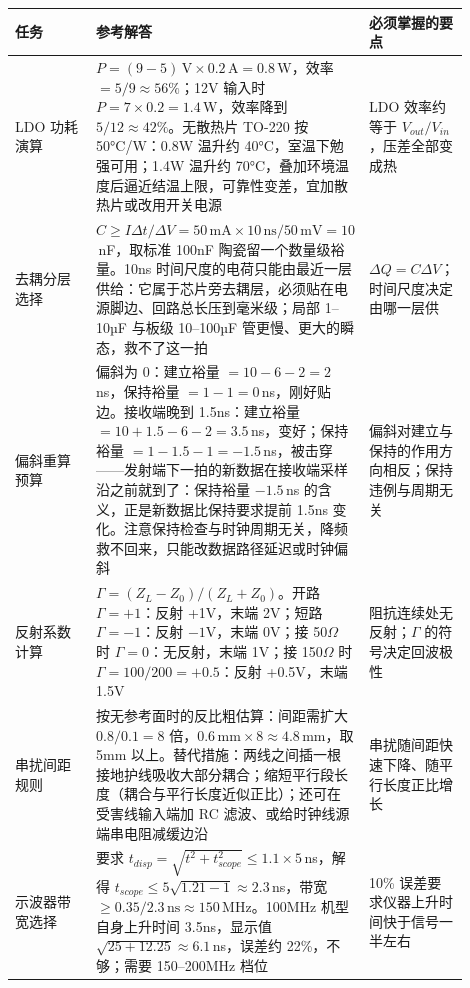 \begin{longtable}{L{0.18\linewidth}L{0.5\linewidth}L{0.22\linewidth}}
\toprule
任务 & 参考解答 & 必须掌握的要点 \\
\midrule
LDO 功耗演算 & $P = (9-5)\,\mathrm{V} \times 0.2\,\mathrm{A} = 0.8$\,W，效率 $= 5/9 \approx 56\%$；12V 输入时 $P = 7 \times 0.2 = 1.4$\,W，效率降到 $5/12 \approx 42\%$。无散热片 TO-220 按 50°C/W：0.8W 温升约 40°C，室温下勉强可用；1.4W 温升约 70°C，叠加环境温度后逼近结温上限，可靠性变差，宜加散热片或改用开关电源 & LDO 效率约等于 $V_{out}/V_{in}$，压差全部变成热 \\
去耦分层选择 & $C \geq I\Delta t/\Delta V = 50\,\mathrm{mA} \times 10\,\mathrm{ns} / 50\,\mathrm{mV} = 10$\,nF，取标准 100nF 陶瓷留一个数量级裕量。10ns 时间尺度的电荷只能由最近一层供给：它属于芯片旁去耦层，必须贴在电源脚边、回路总长压到毫米级；局部 1--10µF 与板级 10--100µF 管更慢、更大的瞬态，救不了这一拍 & $\Delta Q = C\Delta V$；时间尺度决定由哪一层供 \\
偏斜重算预算 & 偏斜为 0：建立裕量 $= 10-6-2 = 2$\,ns，保持裕量 $= 1-1 = 0$\,ns，刚好贴边。接收端晚到 1.5ns：建立裕量 $= 10+1.5-6-2 = 3.5$\,ns，变好；保持裕量 $= 1-1.5-1 = -1.5$\,ns，被击穿——发射端下一拍的新数据在接收端采样沿之前就到了：保持裕量 $-1.5$\,ns 的含义，正是新数据比保持要求提前 1.5ns 变化。注意保持检查与时钟周期无关，降频救不回来，只能改数据路径延迟或时钟偏斜 & 偏斜对建立与保持的作用方向相反；保持违例与周期无关 \\
反射系数计算 & $\Gamma = (Z_L - Z_0)/(Z_L + Z_0)$。开路 $\Gamma = +1$：反射 +1V，末端 2V；短路 $\Gamma = -1$：反射 $-1$V，末端 0V；接 50$\Omega$ 时 $\Gamma = 0$：无反射，末端 1V；接 150$\Omega$ 时 $\Gamma = 100/200 = +0.5$：反射 +0.5V，末端 1.5V & 阻抗连续处无反射；$\Gamma$ 的符号决定回波极性 \\
串扰间距规则 & 按无参考面时的反比粗估算：间距需扩大 $0.8/0.1 = 8$ 倍，$0.6\,\mathrm{mm} \times 8 \approx 4.8$\,mm，取 5mm 以上。替代措施：两线之间插一根接地护线吸收大部分耦合；缩短平行段长度（耦合与平行长度近似正比）；还可在受害线输入端加 RC 滤波、或给时钟线源端串电阻减缓边沿 & 串扰随间距快速下降、随平行长度正比增长 \\
示波器带宽选择 & 要求 $t_{disp} = \sqrt{t^2 + t_{scope}^2} \leq 1.1 \times 5$\,ns，解得 $t_{scope} \leq 5\sqrt{1.21-1} \approx 2.3$\,ns，带宽 $\geq 0.35/2.3\,\mathrm{ns} \approx 150$\,MHz。100MHz 机型自身上升时间 3.5ns，显示值 $\sqrt{25+12.25} \approx 6.1$\,ns，误差约 22\%，不够；需要 150--200MHz 档位 & 10\% 误差要求仪器上升时间快于信号一半左右 \\
\bottomrule
\end{longtable}
